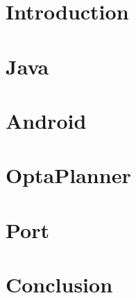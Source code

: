 \chapter{Introduction}


\chapter{Java}


\chapter{Android}


\chapter{OptaPlanner}


\chapter{Port}


\chapter{Conclusion}


